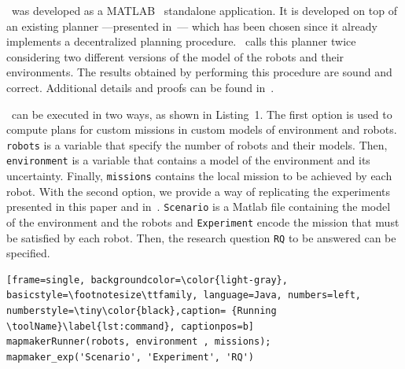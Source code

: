 
\toolName\  was developed as a  MATLAB~\cite{matlab} standalone application.
It is developed on top of an existing planner ---presented in~\cite{tumova2016multi}--- which has been chosen since it already implements a decentralized planning procedure.
\toolName\ calls this planner twice considering two different versions of the model of the robots and their environments. 
The results obtained by performing this procedure are sound and correct.
Additional details and proofs can be found in~\cite{mapmaker17}.


\toolName\ can be executed in two ways, as shown in Listing~1.
The first option is used to compute plans for custom missions in custom models of environment and robots.
\texttt{robots} is a variable that specify the number of robots and their models.
Then, \texttt{environment} is a variable that contains a model of the environment and its uncertainty.
Finally, \texttt{missions} contains the local mission to be achieved by each robot.
With the second option, we provide a way of replicating the experiments presented in this paper and in~\cite{mapmaker17}.
\texttt{Scenario} is a Matlab file containing the model of the environment and the robots and \texttt{Experiment} encode the mission that must be satisfied by each robot.
Then, the research question \texttt{RQ} to be answered can be specified.



\begin{lstlisting}[frame=single, backgroundcolor=\color{light-gray}, basicstyle=\footnotesize\ttfamily, language=Java, numbers=left, numberstyle=\tiny\color{black},caption= {Running \toolName}\label{lst:command}, captionpos=b]
mapmakerRunner(robots, environment , missions);
mapmaker_exp('Scenario', 'Experiment', 'RQ')
\end{lstlisting}







